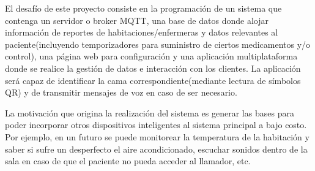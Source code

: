 \documentclass[
11pt, %
]{charter}
\begin{document}
El desafío de este proyecto consiste en la programación de un sistema que contenga un servidor o broker MQTT, una base de datos donde alojar información de reportes de habitaciones/enfermeras y datos relevantes al paciente(incluyendo temporizadores para suministro de ciertos medicamentos y/o control), una página web para configuración y una aplicación multiplataforma donde se realice la gestión de datos e interacción con los clientes. La aplicación será capaz de identificar la cama correspondiente(mediante lectura de símbolos QR) y de transmitir mensajes de voz en caso de ser necesario.

La motivación que origina la realización del sistema es generar las bases para poder incorporar otros dispositivos inteligentes al sistema principal a bajo costo. Por ejemplo, en un futuro se puede monitorear la temperatura de la habitación y saber si sufre un desperfecto el aire acondicionado, escuchar sonidos dentro de la sala en caso de que el paciente no pueda acceder al llamador, etc.




%
\end{document}

